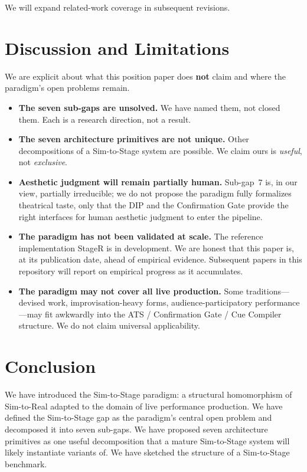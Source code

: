 \documentclass[11pt]{article}
\begin{document}
We will expand related-work coverage in subsequent revisions.

\section{Discussion and Limitations}
\label{sec:discussion}

We are explicit about what this position paper does \textbf{not} claim and
where the paradigm's open problems remain.

\begin{itemize}
\item \textbf{The seven sub-gaps are unsolved.}  We have named them, not
      closed them.  Each is a research direction, not a result.
\item \textbf{The seven architecture primitives are not unique.}  Other
      decompositions of a Sim-to-Stage system are possible.  We claim ours
      is \emph{useful}, not \emph{exclusive}.
\item \textbf{Aesthetic judgment will remain partially human.}  Sub-gap~7
      is, in our view, partially irreducible; we do not propose the paradigm
      fully formalizes theatrical taste, only that the DIP and the
      Confirmation Gate provide the right interfaces for human aesthetic
      judgment to enter the pipeline.
\item \textbf{The paradigm has not been validated at scale.}  The reference
      implementation StageR is in development.  We are honest that this
      paper is, at its publication date, ahead of empirical evidence.
      Subsequent papers in this repository will report on empirical progress
      as it accumulates.
\item \textbf{The paradigm may not cover all live production.}  Some
      traditions---devised work, improvisation-heavy forms,
      audience-participatory performance---may fit awkwardly into the ATS /
      Confirmation Gate / Cue Compiler structure.  We do not claim universal
      applicability.
\end{itemize}

\section{Conclusion}

We have introduced the Sim-to-Stage paradigm: a structural homomorphism of
Sim-to-Real adapted to the domain of live performance production.  We have
defined the Sim-to-Stage gap as the paradigm's central open problem and
decomposed it into seven sub-gaps.  We have proposed seven architecture
primitives as one useful decomposition that a mature Sim-to-Stage system
will likely instantiate variants of.  We have sketched the structure of a
Sim-to-Stage benchmark.
\end{document}
